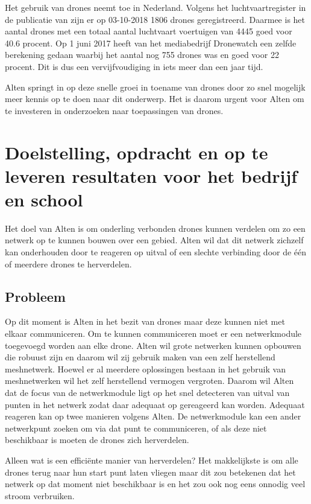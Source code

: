 \documentclass[a4paper, 11pt, oneside]{report}
\begin{document}
Het gebruik van drones neemt toe in Nederland.
Volgens het luchtvaartregister in de publicatie van  zijn er op 03-10-2018 1806 drones geregistreerd. 
Daarmee is het aantal drones met een totaal aantal luchtvaart voertuigen van 4445 goed voor 40.6 procent.
Op 1 juni 2017 heeft  van het mediabedrijf Dronewatch een zelfde berekening gedaan waarbij het aantal nog 755 drones was en goed voor 22 procent. Dit is dus een vervijfvoudiging in iets meer dan een jaar tijd.

Alten springt in op deze snelle groei in toename van drones door zo snel mogelijk meer kennis op te doen naar dit onderwerp.
Het is daarom urgent voor Alten om te investeren in onderzoeken naar toepassingen van drones.

\chapter{Doelstelling, opdracht en op te leveren resultaten voor het bedrijf en school}
\label{chapter:doelstelling}
Het doel van Alten is om onderling verbonden drones kunnen verdelen om zo een netwerk op te kunnen bouwen over een gebied. 
Alten wil dat dit netwerk zichzelf kan onderhouden door te reageren op uitval of een slechte verbinding door de één of meerdere drones te herverdelen.

\section{Probleem}
Op dit moment is Alten in het bezit van drones maar deze kunnen niet met elkaar communiceren.
Om te kunnen communiceren moet er een netwerkmodule toegevoegd worden aan elke drone.
Alten wil grote netwerken kunnen opbouwen die robuust zijn en daarom wil zij gebruik maken van een zelf herstellend meshnetwerk.
Hoewel er al meerdere oplossingen bestaan in het gebruik van meshnetwerken wil het zelf herstellend vermogen vergroten. 
Daarom wil Alten dat de focus van de netwerkmodule ligt op het snel detecteren van uitval van punten in het netwerk zodat daar adequaat op gereageerd kan worden.
Adequaat reageren kan op twee manieren volgens Alten.
De netwerkmodule kan een ander netwerkpunt zoeken om via dat punt te communiceren, of als deze niet beschikbaar is moeten de drones zich herverdelen.

Alleen wat is een efficiënte manier van herverdelen?
Het makkelijkste is om alle drones terug naar hun start punt laten vliegen maar dit zou betekenen dat het netwerk op dat moment niet beschikbaar is en het zou ook nog eens onnodig veel stroom verbruiken.
\end{document}
